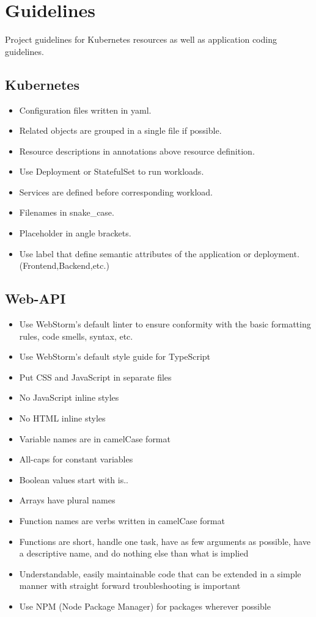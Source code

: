 \chapter{Guidelines}
Project guidelines for Kubernetes resources as well as application coding guidelines.

\section{Kubernetes}
\begin{itemize}
    \item Configuration files written in yaml.
    \item Related objects are grouped in a single file if possible.
    \item Resource descriptions in annotations above resource definition.
    \item Use Deployment or StatefulSet to run workloads.
    \item Services are defined before corresponding workload.
    \item Filenames in snake\_case.
    \item Placeholder in angle brackets.
    \item Use label that define semantic attributes of the application or deployment. (Frontend,Backend,etc.)
\end{itemize}

\section{Web-API}
\begin{itemize}
    \item Use WebStorm's default linter to ensure conformity with the basic formatting rules, code smells, syntax, etc.
    \item Use WebStorm's default style guide for TypeScript
    \item Put CSS and JavaScript in separate files
    \item No JavaScript inline styles
    \item No HTML inline styles
    \item Variable names are in camelCase format
    \item All-caps for constant variables
    \item Boolean values start with is..
    \item Arrays have plural names
    \item Function names are verbs written in camelCase format
    \item Functions are short, handle one task, have as few arguments as possible, have a descriptive name, and do nothing else than what is implied
    \item Understandable, easily maintainable code that can be extended in a simple manner with straight forward troubleshooting is important
    \item Use NPM (Node Package Manager) for packages wherever possible
\end{itemize}